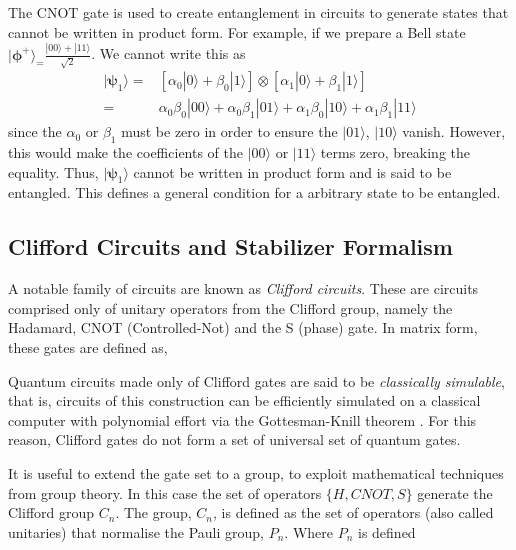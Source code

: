The CNOT gate is used to create entanglement in circuits to
generate states that cannot be written in product form. For example, if we prepare a Bell state
$|{\bm\phi}^{+}\rangle_ = \frac{|00\rangle + |11\rangle}{\sqrt{2}}$. We cannot write this as
\begin{align*}
    |{\bm\psi}_1\rangle = & \left[ \alpha_0 |0\rangle + \beta_0|1\rangle\right] \otimes \left[\alpha_1 |0\rangle + \beta_1|1\rangle\right] \\
    =                     & \alpha_0\beta_0 |00\rangle + \alpha_0\beta_1|01\rangle + \alpha_1\beta_0|10\rangle + \alpha_1\beta_1|11\rangle
\end{align*}
since the $\alpha_0$ or $\beta_1$ must be zero in order to ensure the $|01\rangle$, $|10\rangle$ vanish.
However, this would make the coefficients of the $|00\rangle$
or $|11\rangle$ terms zero, breaking the equality. Thus, $|{\bm\psi}_1\rangle$ cannot be written in
product form and is said to be entangled. This defines a general condition for a arbitrary state to be entangled.


\subsection{Clifford Circuits and Stabilizer Formalism}
A notable family of circuits are known as \textit{Clifford circuits}. These are circuits comprised only of unitary operators
from the Clifford group, namely the Hadamard, CNOT (Controlled-Not) and the S (phase) gate. In matrix form, these gates are defined as,


Quantum circuits made only of Clifford gates are said to be \textit{classically simulable}, that is, circuits of this construction can be efficiently
simulated on a classical computer with polynomial effort via the Gottesman-Knill theorem \cite{knillGottesman}. For this reason, Clifford gates do not form
a set of universal set of quantum gates.

It is useful to extend the gate set to a group, to exploit mathematical techniques from group theory.
In this case the set of operators $\{H, CNOT, S\}$ generate the Clifford group $C_n$. The group, $C_n$,
is defined as the set of operators (also called unitaries) that normalise the Pauli group, $P_n$. Where
$P_n$ is defined


